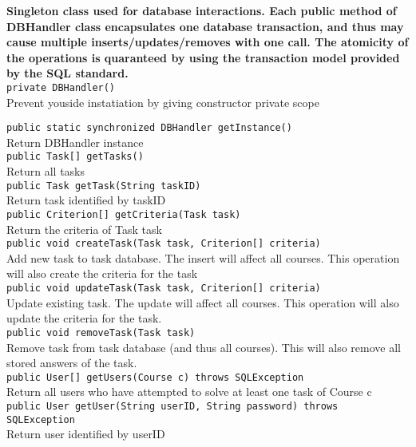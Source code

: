 {\bf Singleton class used for database interactions. Each public method of DBHandler class
encapsulates one database transaction, and thus may cause multiple inserts/updates/removes
with one call. The atomicity of the operations is quaranteed by using the transaction model
provided by the SQL standard.} \\
    
{\tt 		private DBHandler()} \\
Prevent youside instatiation by giving constructor private scope

{\tt 		public static synchronized DBHandler getInstance()} \\
Return DBHandler instance\\
	
{\tt 		public Task[] getTasks()} \\
Return all tasks\\
	
{\tt 		public Task getTask(String taskID)} \\
Return task identified by taskID\\

{\tt		public Criterion[] getCriteria(Task task)}\\
Return the criteria of Task task\\
	
{\tt 		public void createTask(Task task, Criterion[] criteria)} \\
Add new task to task database. The insert will affect all courses. This operation
will also create the criteria for the task\\
	
{\tt 		public void updateTask(Task task, Criterion[] criteria)} \\
Update existing task. The update will affect all courses. This operation
will also update the criteria for the task.\\

{\tt 		public void removeTask(Task task)} \\
Remove task from task database (and thus all courses). This will also remove all stored
answers of the task.\\

{\tt 		public User[] getUsers(Course c) throws SQLException} \\
Return all users who have attempted to solve at least one task of Course c\\
	
{\tt 		public User getUser(String userID, String password) throws SQLException} \\
Return user identified by userID\\

